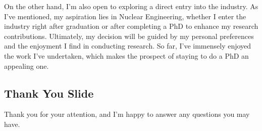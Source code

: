 \documentclass[8pt,a5paper]{article}
\begin{document}
On the other hand, I'm also open to exploring a direct entry into the industry. As I've mentioned, my aspiration lies in Nuclear Engineering, whether I enter the industry right after graduation or after completing a PhD to enhance my research contributions. Ultimately, my decision will be guided by my personal preferences and the enjoyment I find in conducting research. So far, I've immensely enjoyed the work I've undertaken, which makes the prospect of staying to do a PhD an appealing one.

\subsection*{Thank You Slide}

Thank you for your attention, and I'm happy to answer any questions you may have.
\end{document}
